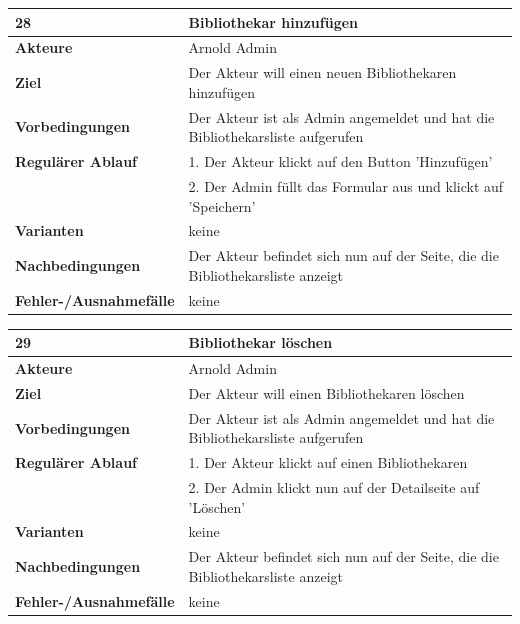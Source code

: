 \documentclass[fontsize=12pt,paper=a4,twoside]{scrartcl}
\begin{document}
\begin{table}[htbp]
\label{28}
\begin{tabular}{|l|p{10cm}|}
\hline 
\textbf{28} & \textbf{Bibliothekar hinzufügen} \\ \hline
\textbf{Akteure} & Arnold Admin\\ \hline
\textbf{Ziel} & Der Akteur will einen neuen Bibliothekaren hinzufügen \\ \hline
\textbf{Vorbedingungen} & Der Akteur ist als Admin angemeldet und hat die Bibliothekarsliste aufgerufen \\ \hline
\textbf{Regulärer Ablauf} & 
1. Der Akteur klickt auf den Button 'Hinzufügen' \\
&2. Der Admin füllt das Formular aus und klickt auf 'Speichern'\\
\hline
\textbf{Varianten} & 
keine \\ \hline
\textbf{Nachbedingungen} & Der Akteur befindet sich nun auf der Seite, die die Bibliothekarsliste anzeigt\\ \hline
\textbf{Fehler-/Ausnahmefälle} & keine\\
\hline
\end{tabular}
\end{table}


\begin{table}[htbp]
\label{29}
\begin{tabular}{|l|p{10cm}|}
\hline 
\textbf{29} & \textbf{Bibliothekar löschen} \\ \hline
\textbf{Akteure} & Arnold Admin\\ \hline
\textbf{Ziel} & Der Akteur will einen Bibliothekaren löschen \\ \hline
\textbf{Vorbedingungen} & Der Akteur ist als Admin angemeldet und hat die Bibliothekarsliste aufgerufen \\ \hline
\textbf{Regulärer Ablauf} & 
1. Der Akteur klickt auf einen Bibliothekaren \\
&2. Der Admin klickt nun auf der Detailseite auf 'Löschen'\\
\hline
\textbf{Varianten} & 
keine \\ \hline
\textbf{Nachbedingungen} & Der Akteur befindet sich nun auf der Seite, die die Bibliothekarsliste anzeigt\\ \hline
\textbf{Fehler-/Ausnahmefälle} & keine\\
\hline
\end{tabular}
\end{table}
\end{document}
